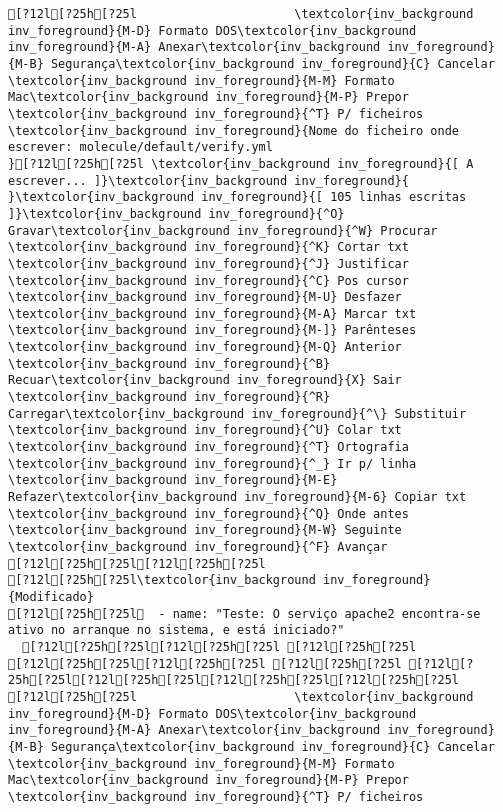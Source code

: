 \documentclass{scrartcl}
\begin{document}
\begin{Verbatim}
[?12l[?25h[?25l                      \textcolor{inv_background inv_foreground}{M-D} Formato DOS\textcolor{inv_background inv_foreground}{M-A} Anexar\textcolor{inv_background inv_foreground}{M-B} Segurança\textcolor{inv_background inv_foreground}{C} Cancelar                        \textcolor{inv_background inv_foreground}{M-M} Formato Mac\textcolor{inv_background inv_foreground}{M-P} Prepor         \textcolor{inv_background inv_foreground}{^T} P/ ficheiros
\textcolor{inv_background inv_foreground}{Nome do ficheiro onde escrever: molecule/default/verify.yml                                                                                                                                  }[?12l[?25h[?25l \textcolor{inv_background inv_foreground}{[ A escrever... ]}\textcolor{inv_background inv_foreground}{          }\textcolor{inv_background inv_foreground}{[ 105 linhas escritas ]}\textcolor{inv_background inv_foreground}{^O} Gravar\textcolor{inv_background inv_foreground}{^W} Procurar      \textcolor{inv_background inv_foreground}{^K} Cortar txt    \textcolor{inv_background inv_foreground}{^J} Justificar    \textcolor{inv_background inv_foreground}{^C} Pos cursor    \textcolor{inv_background inv_foreground}{M-U} Desfazer     \textcolor{inv_background inv_foreground}{M-A} Marcar txt   \textcolor{inv_background inv_foreground}{M-]} Parênteses   \textcolor{inv_background inv_foreground}{M-Q} Anterior     \textcolor{inv_background inv_foreground}{^B} Recuar\textcolor{inv_background inv_foreground}{X} Sair    \textcolor{inv_background inv_foreground}{^R} Carregar\textcolor{inv_background inv_foreground}{^\} Substituir    \textcolor{inv_background inv_foreground}{^U} Colar txt     \textcolor{inv_background inv_foreground}{^T} Ortografia    \textcolor{inv_background inv_foreground}{^_} Ir p/ linha   \textcolor{inv_background inv_foreground}{M-E} Refazer\textcolor{inv_background inv_foreground}{M-6} Copiar txt   \textcolor{inv_background inv_foreground}{^Q} Onde antes    \textcolor{inv_background inv_foreground}{M-W} Seguinte     \textcolor{inv_background inv_foreground}{^F} Avançar
[?12l[?25h[?25l[?12l[?25h[?25l
[?12l[?25h[?25l\textcolor{inv_background inv_foreground}{Modificado}
[?12l[?25h[?25l  - name: "Teste: O serviço apache2 encontra-se ativo no arranque no sistema, e está iniciado?"
  [?12l[?25h[?25l[?12l[?25h[?25l [?12l[?25h[?25l
[?12l[?25h[?25l[?12l[?25h[?25l [?12l[?25h[?25l [?12l[?25h[?25l[?12l[?25h[?25l[?12l[?25h[?25l[?12l[?25h[?25l
[?12l[?25h[?25l                      \textcolor{inv_background inv_foreground}{M-D} Formato DOS\textcolor{inv_background inv_foreground}{M-A} Anexar\textcolor{inv_background inv_foreground}{M-B} Segurança\textcolor{inv_background inv_foreground}{C} Cancelar                        \textcolor{inv_background inv_foreground}{M-M} Formato Mac\textcolor{inv_background inv_foreground}{M-P} Prepor         \textcolor{inv_background inv_foreground}{^T} P/ ficheiros

\end{Verbatim}
\end{document}

